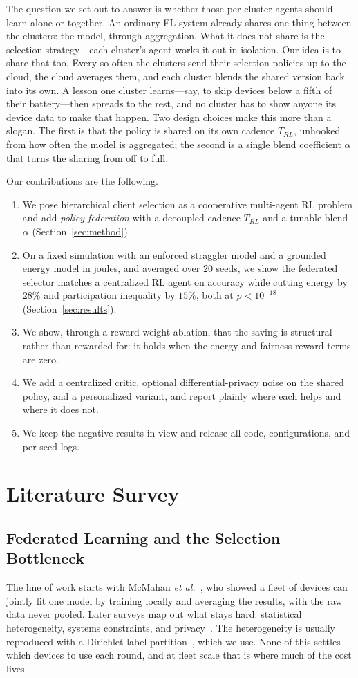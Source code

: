 \documentclass[conference]{IEEEtran}
\begin{document}
The question we set out to answer is whether those per-cluster agents should learn
alone or together. An ordinary FL system already shares one thing between the
clusters: the model, through aggregation. What it does not share is the selection
strategy---each cluster's agent works it out in isolation. Our idea is to share
that too. Every so often the clusters send their selection policies up to the
cloud, the cloud averages them, and each cluster blends the shared version back
into its own. A lesson one cluster learns---say, to skip devices below a fifth of
their battery---then spreads to the rest, and no cluster has to show anyone its
device data to make that happen. Two design choices make this more than a slogan.
The first is that the policy is shared on its own cadence $T_{RL}$, unhooked from
how often the model is aggregated; the second is a single blend coefficient
$\alpha$ that turns the sharing from off to full.

Our contributions are the following.
\begin{enumerate}
\item We pose hierarchical client selection as a cooperative multi-agent RL
problem and add \emph{policy federation} with a decoupled cadence $T_{RL}$ and a
tunable blend $\alpha$ (Section~\ref{sec:method}).
\item On a fixed simulation with an enforced straggler model and a grounded
energy model in joules, and averaged over $20$ seeds, we show the federated
selector matches a centralized RL agent on accuracy while cutting energy by
$28\%$ and participation inequality by $15\%$, both at $p<10^{-18}$
(Section~\ref{sec:results}).
\item We show, through a reward-weight ablation, that the saving is structural
rather than rewarded-for: it holds when the energy and fairness reward terms are
zero.
\item We add a centralized critic, optional differential-privacy noise on the
shared policy, and a personalized variant, and report plainly where each helps
and where it does not.
\item We keep the negative results in view and release all code, configurations,
and per-seed logs.
\end{enumerate}

\section{Literature Survey}
\subsection{Federated Learning and the Selection Bottleneck}
The line of work starts with McMahan \emph{et al.}~\cite{mcmahan2017}, who showed
a fleet of devices can jointly fit one model by training locally and averaging the
results, with the raw data never pooled. Later surveys map out what stays hard:
statistical heterogeneity, systems constraints, and privacy~\cite{kairouz2021,
konecny2016}. The heterogeneity is usually reproduced with a Dirichlet label
partition~\cite{hsu2019}, which we use. None of this settles which devices to use
each round, and at fleet scale that is where much of the cost lives.
\end{document}
